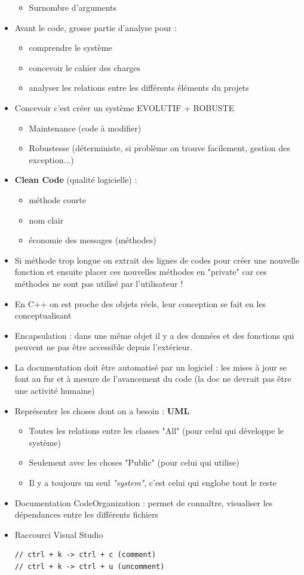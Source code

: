 \documentclass[12pt,a4paper]{article}
\begin{document}
\begin{itemize}
\begin{itemize}
\item Surnombre d'arguments
\end{itemize}
\item Avant le code, grosse partie d'analyse pour : 
\begin{itemize}
\item comprendre le système
\item concevoir le cahier des charges
\item analyser les relations entre les différents éléments du projets
\end{itemize}
\item Concevoir c'est créer un système EVOLUTIF + ROBUSTE
\begin{itemize}
\item Maintenance (code à modifier)
\item Robustesse (déterministe, si problème on trouve facilement, gestion des exception...)
\end{itemize}
\item \textbf{Clean Code} (qualité logicielle) :
\begin{itemize}
\item méthode courte
\item nom clair
\item économie des messages (méthodes)
\end{itemize}
\item Si méthode trop longue on extrait des lignes de codes pour créer une nouvelle fonction et ensuite placer ces nouvelles méthodes en "private" car ces méthodes ne sont pas utilisé par l'utilisateur !
\item En C++ on est proche des objets réels, leur conception se fait en les conceptualisant
\item Encapsulation : dans une même objet il y a des données et des fonctions qui peuvent ne pas être accessible depuis l'extérieur.
\item La documentation doit être automatisé par un logiciel : les mises à jour se font au fur et à mesure de l'avancement du code (la doc ne devrait pas être une activité humaine)
\item Représenter les choses dont on a besoin : \textbf{UML}
\begin{itemize}
\item Toutes les relations entre les classes "All" (pour celui qui développe le système)
\item Seulement avec les choses "Public" (pour celui qui utilise)
\item Il y a toujours un seul \textit{"system"}, c'est celui qui englobe tout le reste
\end{itemize}
\item Documentation CodeOrganization : permet de connaître, visualiser les dépendances entre les différents fichiers
\item Raccourci Visual Studio
\begin{lstlisting}
// ctrl + k -> ctrl + c (comment)
// ctrl + k -> ctrl + u (uncomment)
\end{lstlisting}
\end{itemize}
\end{document}
